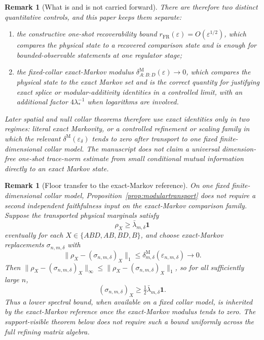 \documentclass[11pt]{article}
\newtheorem{remark}[theorem]{Remark}
\begin{document}
\begin{remark}[What is and is not carried forward]
There are therefore two distinct quantitative controls, and this paper keeps them separate:
\begin{enumerate}[leftmargin=2em]
\item the constructive one-shot recoverability bound \(r_{\mathrm{FR}}(\varepsilon)=O(\varepsilon^{1/2})\), which compares the physical state to a recovered comparison state and is enough for bounded-observable statements at one regulator stage;
\item the fixed-collar exact-Markov modulus \(\delta^{\mathrm M}_{A:B:D}(\varepsilon)\to 0\), which compares the physical state to the exact Markov set and is the correct quantity for justifying exact splice or modular-additivity identities in a controlled limit, with an additional factor \(4\lambda_\ast^{-1}\) when logarithms are involved.
\end{enumerate}
Later spatial and null collar theorems therefore use exact identities only in two regimes: literal exact Markovity, or a controlled refinement or scaling family in which the relevant \(\delta^{\mathrm M}(\varepsilon_\delta)\) tends to zero after transport to one fixed finite-dimensional collar model. The manuscript does \emph{not} claim a universal dimension-free one-shot trace-norm estimate from small conditional mutual information directly to an exact Markov state.
\end{remark}

\begin{remark}[Floor transfer to the exact-Markov reference]
On one fixed finite-dimensional collar model, Proposition~\ref{prop:modulartransport} does not require a second independent faithfulness input on the exact-Markov comparison family. Suppose the transported physical marginals satisfy
\[
\rho_X\ge \bar\lambda_{m,\delta}\mathbf 1
\]
eventually for each \(X\in\{ABD,AB,BD,B\}\), and choose exact-Markov replacements \(\sigma_{n,m,\delta}\) with
\[
\|\rho_X-(\sigma_{n,m,\delta})_X\|_1
\le
\delta^{\mathrm M}_{m,\delta}(\varepsilon_{n,m,\delta})
\longrightarrow 0.
\]
Then \(\|\rho_X-(\sigma_{n,m,\delta})_X\|_\infty\le \|\rho_X-(\sigma_{n,m,\delta})_X\|_1\), so for all sufficiently large \(n\),
\[
(\sigma_{n,m,\delta})_X
\ge
\tfrac12\bar\lambda_{m,\delta}\mathbf 1.
\]
Thus a lower spectral bound, when available on a fixed collar model, is inherited by the exact-Markov reference once the exact-Markov modulus tends to zero. The support-visible theorem below does not require such a bound uniformly across the full refining matrix algebra.
\end{remark}
\end{document}
